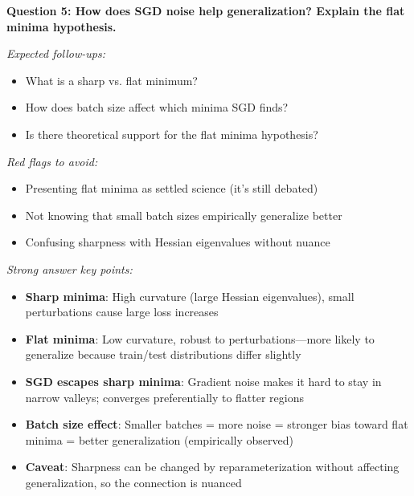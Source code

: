 \documentclass[../../main.tex]{subfiles}
\begin{document}
\begin{interviewquestions}
\vspace{0.5em}
\textbf{Question 5: How does SGD noise help generalization? Explain the flat minima hypothesis.}

\textit{Expected follow-ups:}
\begin{itemize}
    \item What is a sharp vs. flat minimum?
    \item How does batch size affect which minima SGD finds?
    \item Is there theoretical support for the flat minima hypothesis?
\end{itemize}

\textit{Red flags to avoid:}
\begin{itemize}
    \item Presenting flat minima as settled science (it's still debated)
    \item Not knowing that small batch sizes empirically generalize better
    \item Confusing sharpness with Hessian eigenvalues without nuance
\end{itemize}

\textit{Strong answer key points:}
\begin{itemize}
    \item \textbf{Sharp minima}: High curvature (large Hessian eigenvalues), small perturbations cause large loss increases
    \item \textbf{Flat minima}: Low curvature, robust to perturbations---more likely to generalize because train/test distributions differ slightly
    \item \textbf{SGD escapes sharp minima}: Gradient noise makes it hard to stay in narrow valleys; converges preferentially to flatter regions
    \item \textbf{Batch size effect}: Smaller batches = more noise = stronger bias toward flat minima = better generalization (empirically observed)
    \item \textbf{Caveat}: Sharpness can be changed by reparameterization without affecting generalization, so the connection is nuanced
\end{itemize}

\end{interviewquestions}
\end{document}
